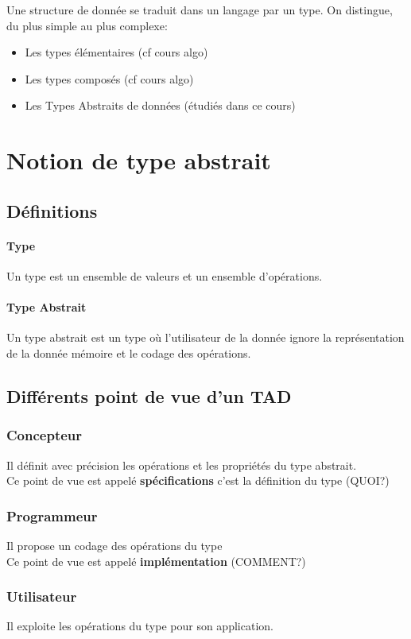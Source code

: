 Une structure de donnée se traduit dans un langage par un type. On distingue, du plus simple au plus complexe: 
\begin{itemize}
	\item Les types élémentaires (cf cours algo)
	\item Les types composés (cf cours algo)
	\item Les Types Abstraits de données (étudiés dans ce cours)
\end{itemize}

\section{Notion de type abstrait}
	\subsection{Définitions}
		\paragraph{Type} Un type est un ensemble de valeurs et un ensemble d'opérations. 
		\paragraph{Type Abstrait} Un type abstrait est un type où l'utilisateur de la donnée ignore la représentation de la donnée mémoire et le codage des opérations.
	\subsection{Différents point de vue d'un TAD}
		\subsubsection{Concepteur}
			Il définit avec précision les opérations et les propriétés du type abstrait.\\
			Ce point de vue est appelé \textbf{spécifications} c'est la définition du type (QUOI?)
		\subsubsection{Programmeur}
			Il propose un codage des opérations du type\\
			Ce point de vue est appelé \textbf{implémentation} (COMMENT?)
		\subsubsection{Utilisateur}
			Il exploite les opérations du type pour son application.
